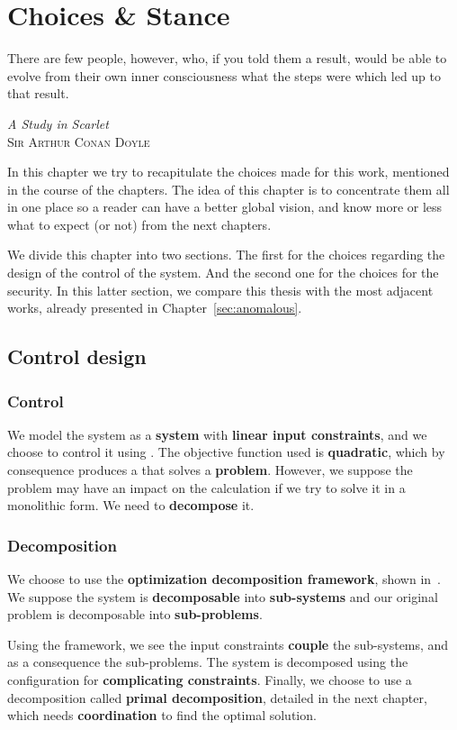 \documentclass[../main.tex]{subfiles}
\begin{document}
\chapter*{Choices \& Stance}\label{sec:positioning}
\epigraph{\centering There are few people, however, who, if you told them a result, would be able to evolve from their own inner consciousness what the steps were which led up to that result.}
{\textit{A Study in Scarlet}\\ \textsc{Sir Arthur Conan Doyle}}

In this chapter we try to recapitulate the choices made for this work, mentioned in the course of the chapters.
The idea of this chapter is to concentrate them all in one place so a reader can have a better global vision, and know more or less what to expect (or not) from the next chapters.

We divide this chapter into two sections.
The first for the choices regarding the design of the control of the system.
And the second one for the choices for the security.
In this latter section, we compare this thesis with the most adjacent works, already presented in Chapter~\ref{sec:anomalous}.

\section*{Control design}
\subsection*{Control}\label{sec:control_chosen}
We model the system as a \textbf{\ltidt{} system} with \textbf{linear input constraints}, and we choose to control it using \textbf{\mpc{}}.
The objective function used is \textbf{quadratic}, which by consequence produces a \mpc{} that solves a \textbf{\qp{} problem}.
However, we suppose the problem may have an impact on the calculation if we try to solve it in a monolithic form. We need to \textbf{decompose} it.

\subsection*{Decomposition}\label{sec:decomposition_chosen}
We choose to use the \textbf{optimization decomposition framework}, shown in~\cite{ConejoEtAl2006,BoydEtAl2015}.
We suppose the system is \textbf{decomposable} into \textbf{sub-systems} and our original problem is decomposable into \textbf{sub-problems}.

Using the framework, we see the input constraints \textbf{couple} the sub-systems, and as a consequence the sub-problems.
The system is decomposed using the configuration for \textbf{complicating constraints}. Finally, we choose to use a decomposition called \textbf{primal decomposition}, detailed in the next chapter, which needs \textbf{coordination} to find the optimal solution.
\end{document}
